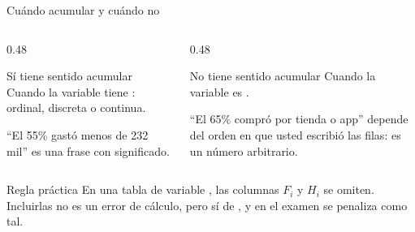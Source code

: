 \documentclass[aspectratio=169,10pt]{beamer}
\begin{document}
\begin{frame}{Cuándo acumular y cuándo no}
  \begin{columns}[T,onlytextwidth]
    \begin{column}{0.48\textwidth}
      \begin{block}{Sí tiene sentido acumular}
        \footnotesize
        Cuando la variable tiene : ordinal, discreta o continua.

        \vspace{0.15cm}
        ``El 55\% gastó menos de 232 mil'' es una frase con significado.
      \end{block}
    \end{column}
    \begin{column}{0.48\textwidth}
      \begin{alertblock}{No tiene sentido acumular}
        \footnotesize
        Cuando la variable es .

        \vspace{0.15cm}
        ``El 65\% compró por tienda o app'' depende del orden en que usted
        escribió las filas: es un número arbitrario.
      \end{alertblock}
    \end{column}
  \end{columns}

  \vspace{0.3cm}
  \begin{exampleblock}{Regla práctica}
    \footnotesize
    En una tabla de variable , las columnas $F_i$ y $H_i$
    se omiten. Incluirlas no es un error de cálculo, pero sí de
    , y en el examen se penaliza como tal.
  \end{exampleblock}
\end{frame}
\end{document}
